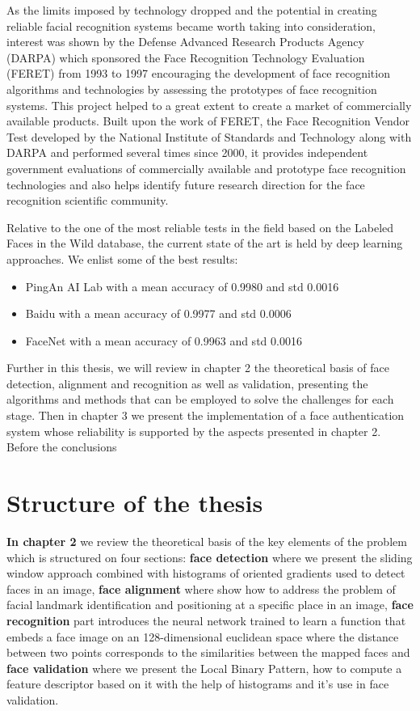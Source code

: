 As the limits imposed by technology dropped and the potential in creating reliable facial recognition systems became worth taking into consideration, interest was shown by the Defense Advanced Research Products Agency (DARPA) which sponsored the Face Recognition Technology Evaluation (FERET) \cite{PhillipsJMHRSRP00} from 1993 to 1997 encouraging the development of face recognition algorithms and technologies by assessing the prototypes of face recognition systems. This project helped to a great extent to create a market of commercially available products.
Built upon the work of FERET, the Face Recognition Vendor Test \cite{PhillipsGMBTB03} developed by the National Institute of Standards and Technology \cite{FaceNist} along with DARPA and performed several times since 2000, it provides independent government evaluations of commercially available and prototype face recognition technologies and also helps identify future research direction for the face recognition scientific community.

Relative to the one of the most reliable tests in the field based on the Labeled Faces in the Wild database, the current state of the art is held by deep learning approaches. We enlist some of the best results:
\begin{itemize}
	\item PingAn AI Lab with a mean accuracy of 0.9980 and std 0.0016
	\item Baidu with a mean accuracy of 0.9977 and std 0.0006
	\item FaceNet with a mean accuracy of 0.9963 and std 0.0016
\end{itemize}


Further in this thesis, we will review in chapter 2 the theoretical basis of face detection, alignment and recognition as well as validation, presenting the algorithms and methods that can be employed to solve the challenges for each stage. Then in chapter 3 we present the implementation of a face authentication system whose reliability is supported by the aspects presented in chapter 2. Before the conclusions 

\section{Structure of the thesis} 

\textbf{In chapter 2} we review the theoretical basis of the key elements of the problem which is structured on four sections: \textbf{face detection} where we present the sliding window approach combined with histograms of oriented gradients used to detect faces in an image, \textbf{face alignment} where show how to address the problem of facial landmark identification and positioning at a specific place in an image, \textbf{face recognition} part introduces the neural network trained to learn a function that embeds a face image on an 128-dimensional euclidean space where the distance between two points corresponds to the similarities between the mapped faces and \textbf{face validation} where we present the Local Binary Pattern, how to compute a feature descriptor based on it with the help of histograms and it's use in face validation.

